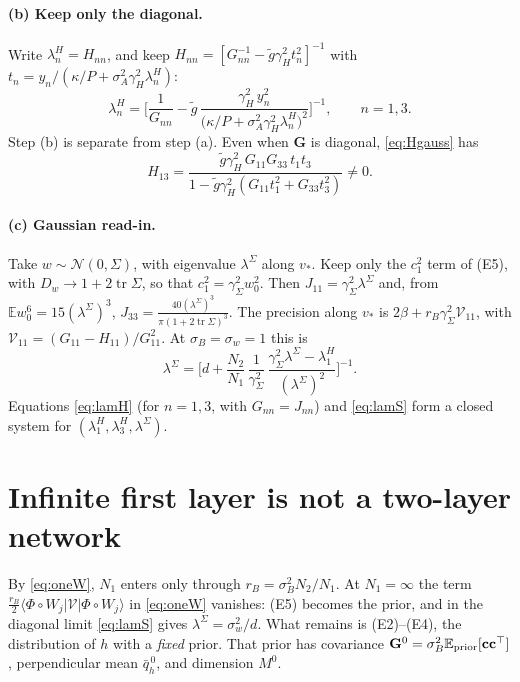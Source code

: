 \documentclass[11pt,a4paper]{article}
\newcommand{\E}{\mathbb{E}}
\newcommand{\tr}{\operatorname{tr}}
\begin{document}
\paragraph{(b) Keep only the diagonal.}
Write $\lambda^H_n=H_{nn}$, and keep $H_{nn}=[G_{nn}^{-1}-\tilde g\gamma_H^2t_n^2]^{-1}$ with $t_n=y_n/(\kappa/P+\sigma_A^2\gamma_H^2\lambda^H_n)$:
\begin{equation}
  \lambda^H_n=\Big[\frac{1}{G_{nn}}-\tilde g\,\frac{\gamma_H^2\,y_n^2}{\big(\kappa/P+\sigma_A^2\gamma_H^2\lambda^H_n\big)^2}\Big]^{-1},
  \qquad n=1,3 .
  \label{eq:lamH}
\end{equation}
Step (b) is separate from step (a).
Even when $\mathbf G$ is diagonal, \eqref{eq:Hgauss} has
\begin{equation}
  H_{13}=\frac{\tilde g\gamma_H^2\,G_{11}G_{33}\,t_1t_3}{1-\tilde g\gamma_H^2(G_{11}t_1^2+G_{33}t_3^2)}\neq0 .
\end{equation}

\paragraph{(c) Gaussian read-in.}
Take $w\sim\mathcal N(0,\Sigma)$, with eigenvalue $\lambda^\Sigma$ along $v_*$.
Keep only the $c_1^2$ term of (E5), with $D_w\to1+2\tr\Sigma$, so that $c_1^2=\gamma_\Sigma^2w_0^2$.
Then $J_{11}=\gamma_\Sigma^2\lambda^\Sigma$ and, from $\E w_0^6=15(\lambda^\Sigma)^3$,
$J_{33}=\frac{40(\lambda^\Sigma)^3}{\pi(1+2\tr\Sigma)^3}$.
The precision along $v_*$ is $2\beta+r_B\gamma_\Sigma^2\mathcal V_{11}$, with
$\mathcal V_{11}=(G_{11}-H_{11})/G_{11}^2$.
At $\sigma_B=\sigma_w=1$ this is
\begin{equation}
  \lambda^\Sigma=\Big[d+\frac{N_2}{N_1}\,\frac{1}{\gamma_\Sigma^2}\,
  \frac{\gamma_\Sigma^2\lambda^\Sigma-\lambda^H_1}{(\lambda^\Sigma)^2}\Big]^{-1}.
  \label{eq:lamS}
\end{equation}
Equations \eqref{eq:lamH} (for $n=1,3$, with $G_{nn}=J_{nn}$) and \eqref{eq:lamS} form a closed system for
$(\lambda^H_1,\lambda^H_3,\lambda^\Sigma)$.

\section{Infinite first layer is not a two-layer network}\label{sec:limit}
By \eqref{eq:oneW}, $N_1$ enters only through $r_B=\sigma_B^2N_2/N_1$.
At $N_1=\infty$ the term $\frac{r_B}{2}\langle\Phi\circ W_j|\mathcal V|\Phi\circ W_j\rangle$ in \eqref{eq:oneW} vanishes: (E5) becomes the prior, and in the diagonal limit \eqref{eq:lamS} gives $\lambda^\Sigma=\sigma_w^2/d$.
What remains is (E2)--(E4), the distribution of $h$ with a \emph{fixed} prior.
That prior has covariance $\mathbf G^0=\sigma_B^2\E_{\rm prior}[\mathbf c\mathbf c^\top]$, perpendicular mean $\bar q^{\,0}_h$, and dimension $M^0$.
\end{document}
